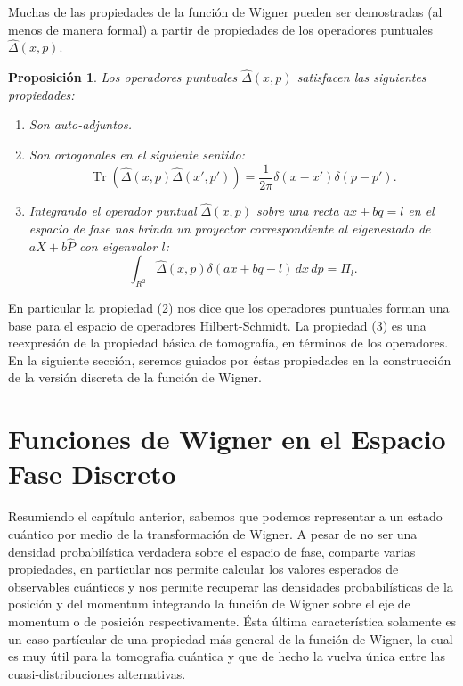 \documentclass[a4paper]{report}
\DeclareMathOperator{\Tr}{Tr}
\newtheorem{proposition}{Proposición}
\begin{document}
  Muchas de las propiedades de la función de Wigner pueden
  ser demostradas (al menos de manera formal) a partir de
  propiedades de los operadores puntuales $\hat\Delta(x,p)$.
  \begin{proposition}
    Los operadores puntuales $\hat\Delta(x,p)$ satisfacen
    las siguientes propiedades:
    \begin{enumerate}
      \item Son auto-adjuntos.
      \item Son ortogonales en el siguiente sentido:
        \begin{equation}
          \Tr\left( \hat\Delta(x,p)\hat\Delta(x',p') \right) 
          = \frac{1}{2\pi} \delta(x-x')\delta(p-p').
        \end{equation}
      \item Integrando el operador puntual $\hat\Delta(x,p)$
        sobre una recta $ax+bq = l$ en el espacio de fase
        nos brinda un proyector correspondiente al
        eigenestado de $a\hat X + b \hat P$ con eigenvalor
        $l$:
        \begin{equation}
          \int_{R^2} \hat\Delta(x,p) \delta(ax+bq-l) \, dx
          \, dp = \Pi_l.
        \end{equation}
    \end{enumerate}
  \end{proposition}
  En particular la propiedad (2) nos dice que los operadores
  puntuales forman una base para el espacio de operadores
  Hilbert-Schmidt. La propiedad (3) es una reexpresión de la
  propiedad básica de tomografía, en términos de los
  operadores. En la siguiente sección, seremos guiados por
  éstas propiedades en la construcción de la versión
  discreta de la función de Wigner. 

  \chapter{Funciones de Wigner en el Espacio Fase Discreto}

  Resumiendo el capítulo anterior, sabemos que podemos
  representar a un estado cuántico por medio de la
  transformación de Wigner.  A pesar de no ser una densidad
  probabilística verdadera sobre el espacio de fase,
  comparte varias propiedades, en particular nos permite
  calcular los valores esperados de observables cuánticos y
  nos permite recuperar las densidades probabilísticas de la
  posición y del momentum integrando la función de Wigner
  sobre el eje de momentum o de posición respectivamente.
  Ésta última característica solamente es un caso partícular
  de una propiedad más general de la función de Wigner, la
  cual es muy útil para la tomografía cuántica y que de
  hecho la vuelva única entre las cuasi-distribuciones
  alternativas.
\end{document}
